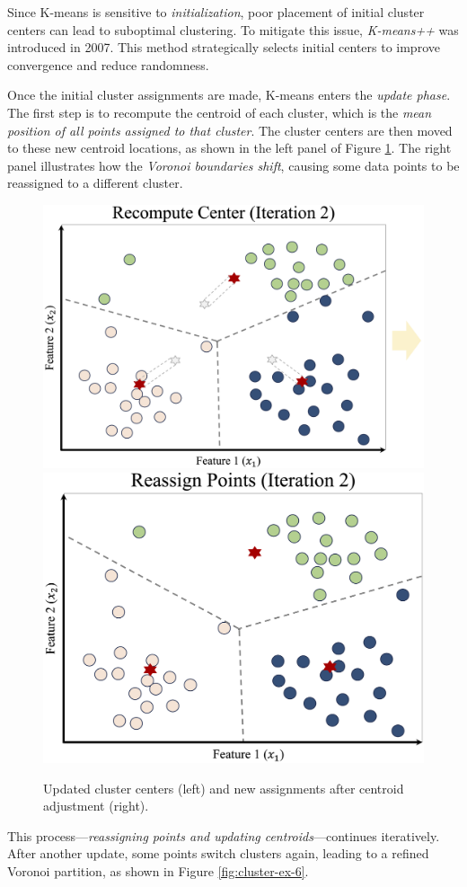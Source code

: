 \documentclass[
  11pt,
]{book}
\theoremstyle{definition}
\theoremstyle{definition}
\theoremstyle{definition}
\theoremstyle{definition}
\theoremstyle{remark}
\begin{document}
Since K-means is sensitive to \emph{initialization}, poor placement of initial cluster centers can lead to suboptimal clustering. To mitigate this issue, \emph{K-means++} \citep{arthur2006k} was introduced in 2007. This method strategically selects initial centers to improve convergence and reduce randomness.

Once the initial cluster assignments are made, K-means enters the \emph{update phase}. The first step is to recompute the centroid of each cluster, which is the \emph{mean position of all points assigned to that cluster}. The cluster centers are then moved to these new centroid locations, as shown in the left panel of Figure \ref{fig:cluster-ex-3}. The right panel illustrates how the \emph{Voronoi boundaries shift}, causing some data points to be reassigned to a different cluster.

\begin{figure}[H]

{\centering \includegraphics[width=0.45\linewidth]{images/ch13_cluster_ex_4} \includegraphics[width=0.45\linewidth]{images/ch13_cluster_ex_5} 

}

\caption{Updated cluster centers (left) and new assignments after centroid adjustment (right).}\label{fig:cluster-ex-3}
\end{figure}

This process---\emph{reassigning points and updating centroids}---continues iteratively. After another update, some points switch clusters again, leading to a refined Voronoi partition, as shown in Figure \ref{fig:cluster-ex-6}.
\end{document}
